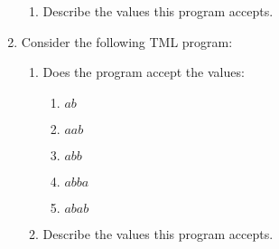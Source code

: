 \documentclass[answers]{exam}
\begin{document}
\begin{enumerate}
\begin{enumerate}
            \item Describe the values this program accepts.
            \begin{solution}
                \vspace*{30pt}
            \end{solution}
        \end{enumerate}
        \newpage

        \item Consider the following TML program:
        
        \begin{enumerate}
            \item Does the program accept the values:
            \begin{enumerate}
                \item $ab$
                \begin{solution}
                    
                \end{solution}
                \newpage
                
                \item $aab$
                \begin{solution}
                    
                \end{solution}
                
                \item $abb$
                \begin{solution}
                    
                \end{solution}
                
                \item $abba$
                \begin{solution}
                    
                \end{solution}
                
                \item $abab$
                \begin{solution}
                    
                \end{solution}
            \end{enumerate}
            
            \item Describe the values this program accepts.
            \begin{solution}
                \vspace*{30pt}
            \end{solution}
        \end{enumerate}
    \end{enumerate}
    
\end{document}
